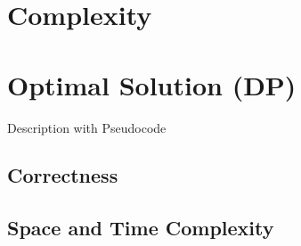 \section{Complexity}


\section{Optimal Solution (DP)}
Description with Pseudocode

\subsection{Correctness}

\subsection{Space and Time Complexity}